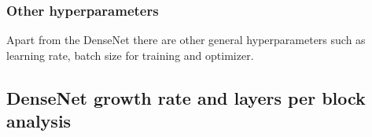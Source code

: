 \subsubsection{Other hyperparameters}
Apart from the DenseNet there are other general hyperparameters such as learning rate, batch size for training and optimizer. 


\subsection{DenseNet growth rate and layers per block analysis}

